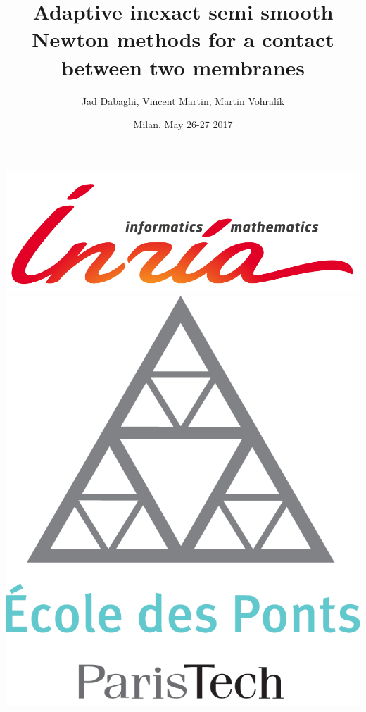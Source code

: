 \documentclass[10 pt]{beamer}
\title[European finite element fair 2017]{Adaptive inexact semi smooth Newton methods for a contact between two membranes}
\author[Jad Dabaghi]{\underline{Jad Dabaghi}, Vincent Martin, Martin Vohral\'ik}
\institute[]{Inria Paris \& Université Paris-Est}
\date{Milan, May 26-27 2017}
\begin{document}
\begin{frame}
\maketitle
\includegraphics[scale=0.3]{INRIA-SCIENTIFIQUE-UK-RVB}
\hfill \includegraphics[scale=0.08]{Logo_ponts_paristech}

\end{frame}
\end{document}
